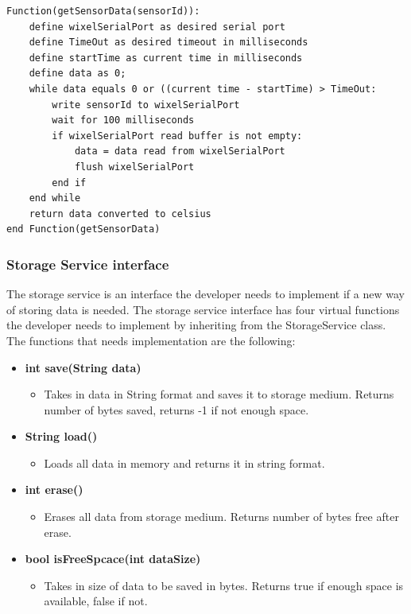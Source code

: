 \begin{lstlisting}[frame=single, label=pseodoWixelSensorService, caption={Pseudocode of WixelSensorService getSensorData() function}]
Function(getSensorData(sensorId)):
    define wixelSerialPort as desired serial port
    define TimeOut as desired timeout in milliseconds
    define startTime as current time in milliseconds
    define data as 0;
    while data equals 0 or ((current time - startTime) > TimeOut:
        write sensorId to wixelSerialPort
        wait for 100 milliseconds
        if wixelSerialPort read buffer is not empty:
            data = data read from wixelSerialPort
            flush wixelSerialPort
        end if
    end while
    return data converted to celsius
end Function(getSensorData)
\end{lstlisting}

\subsubsection{Storage Service interface}
The storage service is an interface the developer needs to implement if a new way of
storing data is needed. The storage service interface has four virtual functions the developer needs to implement by inheriting from the StorageService class. The functions that needs implementation are the following:
\begin{itemize}
    \item \textbf{int save(String data)}
        \begin{itemize}
            \item Takes in data in String format and saves it to storage medium. 
                  Returns number of bytes saved, returns -1 if not enough space.
        \end{itemize}
    \item \textbf{String load()}
        \begin{itemize}
            \item Loads all data in memory and returns it in string format.
        \end{itemize}
    \item \textbf{int erase()}
        \begin{itemize}
            \item Erases all data from storage medium. Returns number of bytes
                  free after erase.
        \end{itemize}
    \item \textbf{bool isFreeSpcace(int dataSize)}
        \begin{itemize}
            \item Takes in size of data to be saved in bytes. Returns true if enough 
                  space is available, false if not.
        \end{itemize}
\end{itemize}
